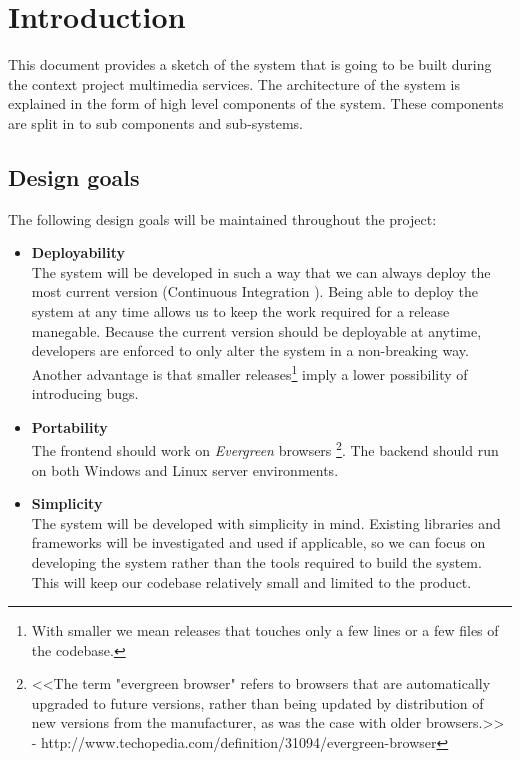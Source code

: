 \chapter{Introduction}
This document provides a sketch of the system that is going to be built during the context project multimedia services. The architecture of the system is explained in the form of high level components of the system. These components are split in to sub components and sub-systems.

\section{Design goals}
The following design goals will be maintained throughout the project:
\begin{itemize}

\item
\textbf{Deployability}
\\
The system will be developed in such a way that we can always deploy the most current version (Continuous Integration \cite{Duvall}).
Being able to deploy the system at any time allows us to keep the work required for a release manegable.
Because the current version should be deployable at anytime, developers are enforced to only alter the system in a non-breaking way.
Another advantage is that smaller releases\footnote{With smaller we mean releases that touches only a few lines or a few files of the codebase.} imply a lower possibility of introducing bugs.

\item
\textbf{Portability}
\\
The frontend should work on \textit{Evergreen} browsers \footnote{<<The term "evergreen browser" refers to browsers that are automatically upgraded to future versions, rather than being updated by distribution of new versions from the manufacturer, as was the case with older browsers.>> - http://www.techopedia.com/definition/31094/evergreen-browser}.
The backend should run on both Windows and Linux server environments.

\item
\textbf{Simplicity}
\\
The system will be developed with simplicity in mind.
Existing libraries and frameworks will be investigated and used if applicable, so we can focus on developing the system rather than the tools required to build the system.
This will keep our codebase relatively small and limited to the product.


\end{itemize}

